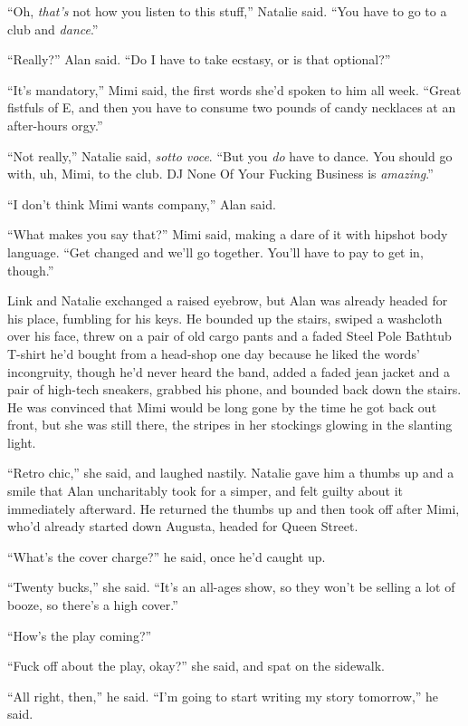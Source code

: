 \documentclass{article}
\begin{document}
``Oh, \textit{that's} not how you listen to this stuff,'' Natalie
said.  ``You have to go to a club and \textit{dance}.''

``Really?'' Alan said.  ``Do I have to take ecstasy, or is that
optional?''

``It's mandatory,'' Mimi said, the first words she'd spoken to him all
week.  ``Great fistfuls of E, and then you have to consume two pounds
of candy necklaces at an after-hours orgy.''

``Not really,'' Natalie said, \textit{sotto voce}.  ``But you
\textit{do} have to dance.  You should go with, uh, Mimi, to the club. 
DJ None Of Your Fucking Business is \textit{amazing}.''

``I don't think Mimi wants company,'' Alan said.

``What makes you say that?'' Mimi said, making a dare of it with
hipshot body language.  ``Get changed and we'll go together.  You'll
have to pay to get in, though.''

Link and Natalie exchanged a raised eyebrow, but Alan was already
headed for his place, fumbling for his keys.  He bounded up the
stairs, swiped a washcloth over his face, threw on a pair of old cargo
pants and a faded Steel Pole Bathtub T-shirt he'd bought from a
head-shop one day because he liked the words' incongruity, though he'd
never heard the band, added a faded jean jacket and a pair of
high-tech sneakers, grabbed his phone, and bounded back down the
stairs.  He was convinced that Mimi would be long gone by the time he
got back out front, but she was still there, the stripes in her
stockings glowing in the slanting light.

``Retro chic,'' she said, and laughed nastily.  Natalie gave him a
thumbs up and a smile that Alan uncharitably took for a simper, and
felt guilty about it immediately afterward.  He returned the thumbs up
and then took off after Mimi, who'd already started down Augusta,
headed for Queen Street.

``What's the cover charge?'' he said, once he'd caught up.

``Twenty bucks,'' she said.  ``It's an all-ages show, so they won't be
selling a lot of booze, so there's a high cover.''

``How's the play coming?''

``Fuck off about the play, okay?'' she said, and spat on the sidewalk.

``All right, then,'' he said.  ``I'm going to start writing my story
tomorrow,'' he said.
\end{document}
